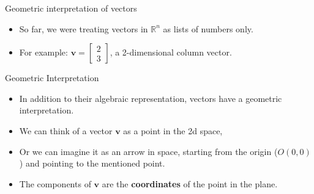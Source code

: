 \documentclass{beamer}
\newcommand{\vv}{\mathbf{v}}
\begin{document}
\begin{frame}{Geometric interpretation of vectors}

  \begin{itemize}[<+->]
    \item So far, we were treating vectors in $\mathbb{R}^n$ as lists of numbers only.
    \item For example: $\vv=\begin{bmatrix}2\\3    \end{bmatrix}$, a 2-dimensional column vector.
  \end{itemize}

  \pause

  \begin{block}{Geometric Interpretation}
    \begin{itemize}
      \item In addition to their algebraic representation, vectors have a geometric interpretation.
      \item We can think of a vector $\mathbf{v}$ as a point in the 2d space,
      
      \item Or we can imagine it as an arrow in space, starting from the origin ($O(0,0)$) and pointing to the mentioned point.
      \item The components of $\vv$ are the \textbf{coordinates} of the point in the plane.
    \end{itemize}
  \end{block}
\end{frame}
\end{document}
